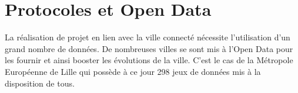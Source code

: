 















\section{Protocoles et Open Data}

La réalisation de projet en lien avec la ville connecté nécessite l'utilisation d'un grand nombre de données.
De nombreuses villes se sont mis à l'Open Data pour les fournir et ainsi booster les évolutions de la ville.
C'est le cas de la Métropole Européenne de Lille qui possède à ce jour 298 jeux de données mis à la disposition de tous.

